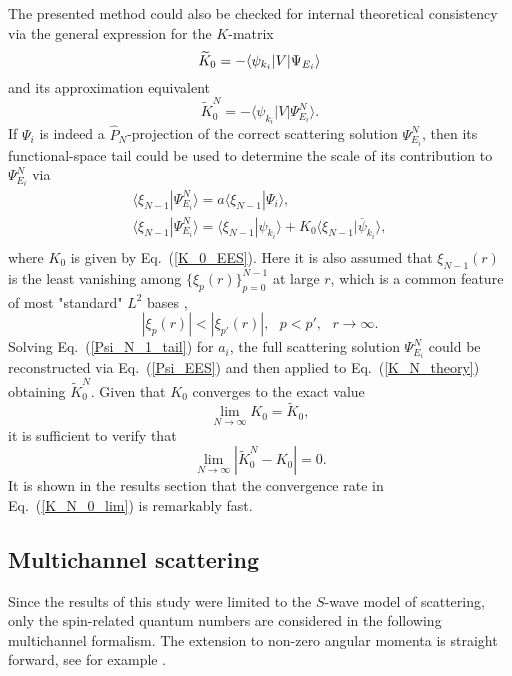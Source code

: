 \documentclass[aip
, pra
, showpacs
, aps
, twocolumn
, groupedaddress
, floatfix
]{revtex4}
\newcommand{\beq}{\begin{equation}}
\newcommand{\eeq}{\end{equation}}
\newcommand{\barr}{\begin{array}}
\newcommand{\earr}{\end{array}}
\begin{document}
The presented method could also be checked for
internal theoretical consistency via the general expression for the $K$-matrix \cite{N82}
\beq
\widetilde{K}_0 = -\langle \psi_{k_i} | V | \Psi_{E_i} \rangle\\
\label{K_theory}\eeq
and its approximation equivalent
\beq
\widetilde{K}^N_0 = -\langle \psi_{k_i} | V | \Psi^N_{E_i} \rangle.
\label{K_N_theory}\eeq
If $\Psi_i$ is indeed a $\hat{P}_N$-projection of the correct scattering solution $\Psi^N_{E_i}$, 
then its functional-space tail could be used to
determine the scale of its contribution to $\Psi^N_{E_i}$ via
\beq \barr{l}
\langle \xi_{N-1} | \Psi^N_{E_i}\rangle
= a \langle \xi_{N-1}| \Psi_i \rangle,\\
\langle \xi_{N-1} | \Psi^N_{E_i}\rangle
 =  \langle \xi_{N-1}| \psi_{k_i} \rangle
+ K_0 \langle \xi_{N-1}| \overline{\psi}_{k_i} \rangle,\\
\earr \label{Psi_N_1_tail} \eeq
where $K_0$ is given by Eq.~(\ref{K_0_EES}). 
Here it is also assumed that $\xi_{N-1}(r)$ is the least vanishing among $\{\xi_p(r)\}_{p=0}^{N-1}$  at large $r$, which is 
a common feature of most "standard" $L^2$ bases \cite{abramowitz}, 
\beq
|\xi_p(r)| < |\xi_{p'}(r)|, \ \ \ p<p', \ \ \ r \rightarrow \infty. 
\eeq
Solving Eq.~(\ref{Psi_N_1_tail}) for $a_i$,
the full scattering solution $\Psi^N_{E_i}$ could be reconstructed via Eq.~(\ref{Psi_EES}) and then applied to Eq.~(\ref{K_N_theory}) obtaining
$\widetilde{K}^N_0$. Given that $K_0$  converges to the exact value \cite{Nesbet68}
\beq
\lim_{N \rightarrow \infty} K_0 = \widetilde{K}_0,
\label{K_0_lim} \eeq
it is sufficient to verify that
\beq
\lim_{N \rightarrow \infty} |\widetilde{K}^N_0 - K_0 | = 0.
\label{K_N_0_lim} \eeq
It is shown in the results section that the convergence rate in Eq.~(\ref{K_N_0_lim}) is remarkably fast.



\subsection{Multichannel scattering}
Since the results of this study were limited to the $S$-wave model of scattering, 
only the spin-related quantum numbers are considered in the
following multichannel formalism. The extension to non-zero angular momenta is straight forward, see for example \cite{BR76p1491}. 
 
\end{document}
